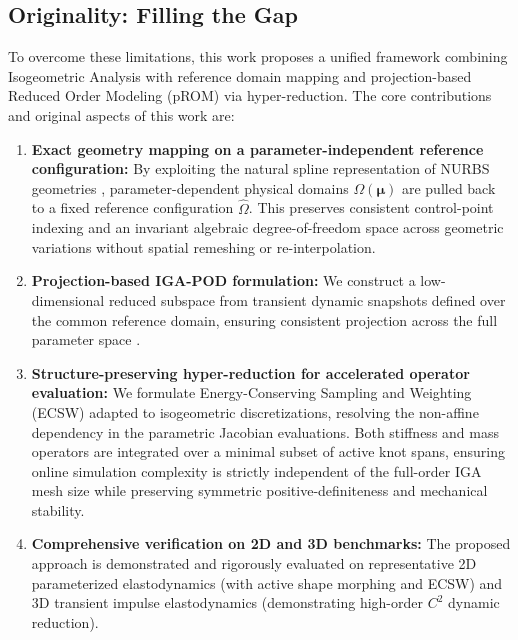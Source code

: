 \subsection{Originality: Filling the Gap}
To overcome these limitations, this work proposes a unified framework combining Isogeometric Analysis with reference domain mapping and projection-based Reduced Order Modeling (pROM) via hyper-reduction. The core contributions and original aspects of this work are:
\begin{enumerate}
    \item \textbf{Exact geometry mapping on a parameter-independent reference configuration:} By exploiting the natural spline representation of NURBS geometries \cite{piegl1997, cottrell2009}, parameter-dependent physical domains $\Omega(\bm{\mu})$ are pulled back to a fixed reference configuration $\hat{\Omega}$. This preserves consistent control-point indexing and an invariant algebraic degree-of-freedom space across geometric variations without spatial remeshing or re-interpolation.
    \item \textbf{Projection-based IGA-POD formulation:} We construct a low-dimensional reduced subspace from transient dynamic snapshots \cite{berkooz1993, willcox2002, Benner2015} defined over the common reference domain, ensuring consistent projection across the full parameter space \cite{zhu2018}.
    \item \textbf{Structure-preserving hyper-reduction for accelerated operator evaluation:} We formulate Energy-Conserving Sampling and Weighting (ECSW) \cite{Farhat2014, farhat2015, Maierhofer2022} adapted to isogeometric discretizations, resolving the non-affine dependency in the parametric Jacobian evaluations. Both stiffness and mass operators are integrated over a minimal subset of active knot spans, ensuring online simulation complexity is strictly independent of the full-order IGA mesh size while preserving symmetric positive-definiteness and mechanical stability.
    \item \textbf{Comprehensive verification on 2D and 3D benchmarks:} The proposed approach is demonstrated and rigorously evaluated on representative 2D parameterized elastodynamics (with active shape morphing and ECSW) and 3D transient impulse elastodynamics (demonstrating high-order $C^2$ dynamic reduction).
\end{enumerate}

